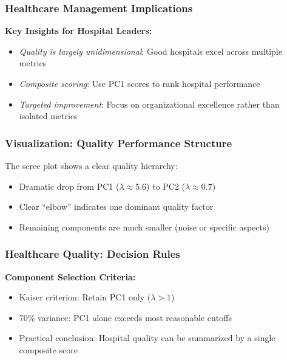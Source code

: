 \documentclass[aspectratio=169]{beamer}
\begin{document}
\begin{frame}
    \frametitle{Healthcare Management Implications}
    \textbf{Key Insights for Hospital Leaders:}
    \begin{itemize}
        \item \textit{Quality is largely unidimensional}: Good hospitals excel across multiple metrics \pause
        \item \textit{Composite scoring}: Use PC1 scores to rank hospital performance \pause
        \item \textit{Targeted improvement}: Focus on organizational excellence rather than isolated metrics \pause
    \end{itemize}
\end{frame}

\begin{frame}
    \frametitle{Visualization: Quality Performance Structure}
    The scree plot shows a clear quality hierarchy:
    \begin{itemize}
        \item Dramatic drop from PC1 ($\lambda \approx 5.6$) to PC2 ($\lambda \approx 0.7$) \pause
        \item Clear ``elbow'' indicates one dominant quality factor \pause
        \item Remaining components are much smaller (noise or specific aspects) \pause
    \end{itemize}
\end{frame}

\begin{frame}
    \frametitle{Healthcare Quality: Decision Rules}
    \textbf{Component Selection Criteria:}
    \begin{itemize}
        \item Kaiser criterion: Retain PC1 only ($\lambda > 1$) \pause
        \item 70\% variance: PC1 alone exceeds most reasonable cutoffs \pause
        \item Practical conclusion: Hospital quality can be summarized by a single composite score \pause
    \end{itemize}
\end{frame}
\end{document}

